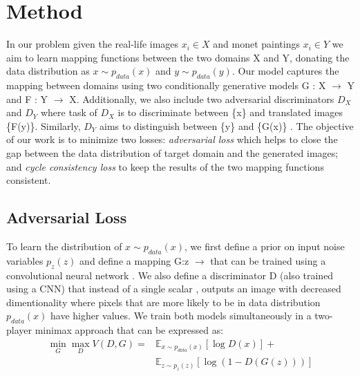 \documentclass[10pt,twocolumn,letterpaper]{article}
\begin{document}
\section{Method}
In our problem given the real-life images $x_{i}\in X$ and monet paintings $x_{i}\in Y$ we aim to learn mapping functions between the two domains X and Y, donating the data distribution as $x \sim p_{data}(x)$ and $y \sim p_{data}(y)$. Our model captures the mapping between domains using two conditionally generative \cite{imgtoimg} models G : X $\longrightarrow$ Y and F : Y $\longrightarrow$ X. Additionally, we also include two adversarial discriminators $D_{X}$ and $D_{Y}$ where task of $D_{X}$ is to discriminate between \{x\} and translated images \{F(y)\}. Similarly, $D_{Y}$ aims to distinguish between \{y\} and \{G(x)\} \cite{cyclegan}. The objective of our work is to minimize two losses: \emph{adversarial loss} \cite{simplegan} which helps to close the gap between the data distribution of target domain and the generated images; and \emph{cycle consistency loss} to keep the results of the two mapping functions consistent.

\subsection{Adversarial Loss}
To learn the distribution of $x \sim p_{data}(x)$, we first define a prior on input noise variables $p_{z}(z)$ and define a mapping G:z $\longrightarrow$ that can be trained using a convolutional neural network \cite{cnn}. We also define a discriminator D (also trained using a CNN) that instead of a single scalar \cite{simplegan}, outputs an image with decreased dimentionality where pixels that are more likely to be in data distribution $p_{data}(x)$ have higher values. We train both models simultaneously in a two-player minimax approach that can be expressed as:
\begin{equation}
	\begin{split}
		\min_G \max_D V(D,G) = &\mathbb{E}_{x \sim p_{data}(x)}[\log{D(x)}]+ \\
		&\mathbb{E}_{z \sim p_{z}(z)}[\log{(1-D(G(z)))}]
	\end{split}
\end{equation}
\end{document}

